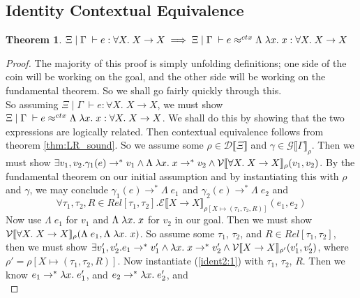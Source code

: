 \documentclass[twoside,11pt,openright]{report}
\newtheorem{theorem}{Theorem}
\theoremstyle{definition}
\newcommand{\var}{x}
\newcommand{\expr}{e}
\newcommand{\val}{v}
\newcommand{\Tvar}{X}
\newcommand{\Tlam}{\Lambda\;}
\newcommand{\Tfunc}[2]{#1 \rightarrow #2}
\newcommand{\Tall}[2]{\forall #1.\; #2}
\newcommand{\typ}{\tau}
\newcommand{\venv}{\Gamma}
\newcommand{\tenv}{\Xi}
\newcommand{\jdg}[4]{#1 \; | \; #2 \; \vdash #3 : #4}
\newcommand{\jdgRel}[6]{#1 \; | \; #2 \; \vdash #3 \approx^{#4} #5 : #6}
\newcommand{\ctxRel}[5]{\jdgRel{#1}{#2}{#3}{ctx}{#4}{#5}}
\newcommand{\stepS}{\rightarrow^*}
\newcommand{\ValInp}[2]{\mathcal{V} \llbracket #1 \rrbracket_{#2}}
\newcommand{\ExpInp}[2]{\mathcal{E} \llbracket #1 \rrbracket_{#2}}
\newcommand{\VenvInp}[2]{\mathcal{G} \llbracket #1 \rrbracket_{#2}}
\newcommand{\TenvInp}[1]{\mathcal{D} \llbracket #1 \rrbracket}
\newcommand{\map}[2]{#1 \mapsto #2}
\begin{document}
\subsection{Identity Contextual Equivalence}
\begin{theorem}
  $\jdg{\tenv}{\venv}{\expr}{\Tall{\Tvar}{\Tfunc{\Tvar}{\Tvar}}} \implies \ctxRel{\tenv}{\venv}{\expr}{\Tlam \fun \var . \var}{\Tall{\Tvar}{\Tfunc{\Tvar}{\Tvar}}}$
\end{theorem}
\begin{proof}
  The majority of this proof is simply unfolding definitions; one side of the coin will be working on the goal, and the other side will be working on the fundamental theorem. So we shall go fairly quickly through this.\\
  So assuming $\jdg{\tenv}{\venv}{\expr}{\Tall{\Tvar}{\Tfunc{\Tvar}{\Tvar}}}$, we must show $\ctxRel{\tenv}{\venv}{\expr}{\Tlam \fun \var . \var}{\Tall{\Tvar}{\Tfunc{\Tvar}{\Tvar}}}$. We shall do this by showing that the two expressions are logically related. Then contextual equivalence follows from theorem \ref{thm:LR_sound}. So we assume some $ \rho \in \TenvInp{\tenv}$ and $\gamma \in \VenvInp{\venv}{\rho}$. Then we must show $\exists \val_1, \val_2 . \gamma_1(\expr) \stepS \val_1 \land \Tlam \fun \var . \var \stepS \val_2 \land \ValInp{\Tall{\Tvar}{\Tfunc{\Tvar}{\Tvar}}}{\rho}(\val_1, \val_2)$. By the fundamental theorem on our initial assumption and by instantiating this with $\rho$ and $\gamma$, we may conclude $\gamma_1(\expr) \stepS \Tlam \expr_1$ and $\gamma_2(\expr) \stepS \Tlam \expr_2$ and 
  \begin{equation}\label{ident2:1}
    \forall \typ_1, \typ_2, R \in Rel[\typ_1, \typ_2] . \ExpInp{\Tfunc{\Tvar}{\Tvar}}{\rho[\map{\Tvar}{(\typ_1, \typ_2, R)}]}(\expr_1, \expr_2)
  \end{equation}
  Now use $\Tlam \expr_1$ for $\val_1$ and $\Tlam \fun \var . \var$ for $\val_2$ in our goal. Then we must show $\ValInp{\Tall{\Tvar}{\Tfunc{\Tvar}{\Tvar}}}{\rho}(\Tlam \expr_1, \Tlam \fun \var . \var)$. So assume some $\typ_1$, $\typ_2$, and $R \in Rel[\typ_1, \typ_2]$, then we must show 
  $\exists \val_1', \val_2' . \expr_1 \stepS \val_1' \land \fun \var . \var \stepS \val_2' \land \ValInp{\Tfunc{\Tvar}{\Tvar}}{\rho'}(\val_1', \val_2')$, where $\rho' = \rho[\map{\Tvar}{(\typ_1, \typ_2, R)}]$.
  Now instantiate (\ref*{ident2:1}) with $\typ_1$, $\typ_2$, $R$. Then we know $\expr_1 \stepS \fun \var . \expr_1'$, and $\expr_2 \stepS \fun \var . \expr_2'$, and
  \begin{equation}\label{ident2:2}

\end{equation}
\end{proof}
\end{document}

